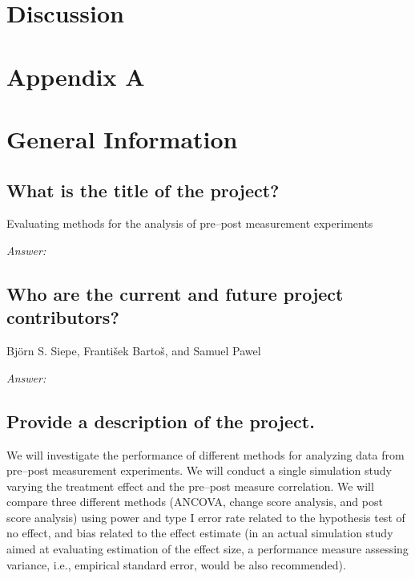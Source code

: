 \documentclass[12pt]{article}
\begin{document}
\section{Discussion}


\section*{Appendix A}


\section{General Information}
\subsection{What is the title of the project?}

\begin{examplebox}
Evaluating methods for the analysis of pre--post measurement experiments
\end{examplebox}

\textit{Answer:}

\subsection{Who are the current and future project contributors?}

\begin{examplebox}
    Björn S. Siepe, František Bartoš, and Samuel Pawel
\end{examplebox}

\textit{Answer:}

\subsection{Provide a description of the project.}


\begin{examplebox}
    We will investigate the performance of different methods for analyzing data from pre--post measurement experiments. We will conduct a single simulation study varying the treatment effect and the pre--post measure correlation. We will compare three different methods (ANCOVA, change score analysis, and post score analysis) using power and type I error rate related to the hypothesis test of no effect, and bias related to the effect estimate (in an actual simulation study aimed at evaluating estimation of the effect size, a performance measure assessing variance, i.e., empirical standard error, would be also recommended).  
\end{examplebox}
\end{document}
